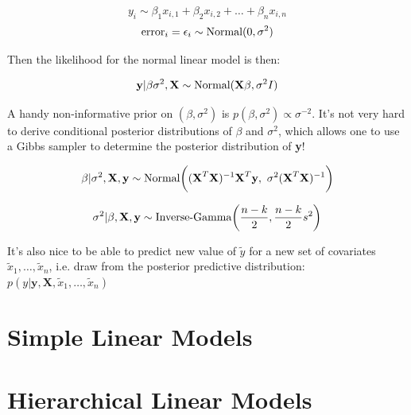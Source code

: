 \documentclass[12pt]{book}
\begin{document}
\begin{equation}
	y_i \sim \beta_1x_{i,1} +  \beta_2x_{i,2} + \dots +  \beta_nx_{i,n}
\end{equation}
\begin{equation}
	\textnormal{error}_i = \epsilon_i \sim \textnormal{Normal}(0, \sigma^2)
\end{equation}

Then the likelihood for the normal linear model is then:

\begin{equation}
	\textbf{y}|\beta \sigma^2, \textbf{X} \sim \textnormal{Normal}(\textbf{X}\beta, \sigma^2 I)
\end{equation}

A handy non-informative prior on $(\beta, \sigma^2)$ is $p(\beta, \sigma^2) \propto \sigma^{-2}$. It's not very hard to derive conditional posterior distributions of $\beta$ and $\sigma^2$, which allows one to use a Gibbs sampler to determine the posterior distribution of \textbf{y}!

\begin{equation}
	\beta| \sigma^2, \textbf{X}, \textbf{y} \sim \textnormal{Normal}\bigg((\textbf{X}^T\textbf{X})^{-1}\textbf{X}^T\textbf{y}, \ \sigma^2(\textbf{X}^T\textbf{X})^{-1}  \bigg)
\end{equation}

\begin{equation}
	\sigma^2|\beta, \textbf{X}, \textbf{y} \sim \textnormal{Inverse-Gamma}\bigg(\frac{n-k}{2}, \frac{n-k}{2}s^2 \bigg)
\end{equation}

It's also nice to be able to predict new value of $\widetilde y$ for a new set of covariates $\widetilde x_1, \dots,\widetilde x_n $, i.e. draw from the posterior predictive distribution: $p(y|\textbf{y}, \textbf{X}, \widetilde x_1, \dots,\widetilde x_n)$



	\section{Simple Linear Models}
	\section{Hierarchical Linear Models}
\end{document}
